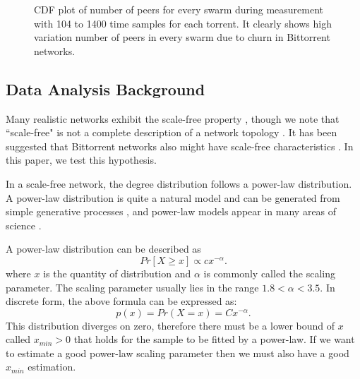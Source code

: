 \documentclass[10pt,conference,letterpaper,final]{IEEEtran}
\begin{document}
\begin{figure}
\centering
{}
\caption{CDF plot of number of peers for every swarm during measurement with 104 to 1400 time samples for each torrent. It  clearly shows high variation number of peers in every swarm due to churn in Bittorrent networks.} 
\label{fig:num_peers}
\vspace{-2mm}
\end{figure}

\subsection{Data Analysis Background}
Many realistic networks exhibit the scale-free property \cite{clauset2009power}, though we note that ``scale-free" is not a complete description of a network topology \cite{doyle2005robust}\cite{mahadevan2006systematic}. 
It has been suggested that Bittorrent networks also might have scale-free characteristics \cite{dale2008evolution}. 
In this paper, we test this hypothesis. 

In a scale-free network, the degree distribution follows a power-law distribution.   
A power-law distribution is quite a natural model and can be generated from simple generative processes \cite{mitzenmacher2004brief}, and power-law models appear in many areas of science \cite{clauset2009power} \cite{mitzenmacher2004brief}. 

A power-law distribution can be described as
\begin{equation}
Pr[X\ge x] \propto cx^{-\alpha}.
\label{eq:powerlaw}
\end{equation}
where $x$ is the quantity of distribution and $\alpha$ is commonly called the scaling parameter. 
The scaling parameter usually lies in the range $1.8<\alpha<3.5$.
In discrete form, the above formula can be expressed as:
\begin{equation}
p(x) = Pr(X=x) = Cx^{- \alpha}.
\label{eq:powerlawdiscrete}
\end{equation}
This distribution diverges on zero, therefore there must be a lower bound of $x$ called $x_{min} > 0$ that holds for the sample to be fitted by a power-law. 
If we want to estimate a good power-law scaling parameter then we must also have a good $x_{min}$ estimation. 
\end{document}
